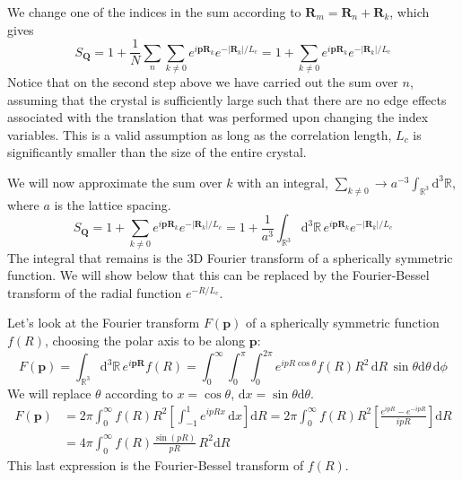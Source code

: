 \documentclass[11pt,letter]{article}
\newcommand{\bv}[1]{\ensuremath{\bm{#1}}}
\begin{document}
We change one of the indices in the sum according to
$\bv{R}_{m} = \bv{R}_{n} + \bv{R}_{k}$, which gives
\begin{equation}
S_{\bv{Q}} = 1+  
   \frac{1}{N} 
      \sum_{n}\sum_{k\neq 0}  
      e^{ i \bv{p}\bv{R}_{k} } 
   e^{-|\bv{R}_{k}| / L_{c} }  
   = 1+ 
      \sum_{k\neq 0}  
      e^{ i \bv{p}\bv{R}_{k} } 
   e^{-|\bv{R}_{k}| / L_{c} }  
\end{equation}
Notice that on the second step above we have carried out the sum over $n$,
assuming that the crystal is sufficiently large such that there are no edge
effects associated with the translation that was performed upon changing the
index variables.  This is a valid assumption as long as the correlation length,
$L_{c}$ is significantly smaller than the size of the entire crystal. 

We will now approximate the sum over $k$ with an integral, $\sum_{k\neq 0}
\rightarrow a^{-3}\int_{\mathbb{R}^{3}} \mathrm{d}^{3}\mathbb{R}$,  where $a$
is the lattice spacing. 
\begin{equation}
S_{\bv{Q}} = 1 +  
      \sum_{k\neq 0 }  
      e^{ i \bv{p}\bv{R}_{k}  }  
   e^{-|\bv{R}_{k}| / L_{c} }  
     =  1 + 
   \frac{1}{a^{3}} 
   \int_{\mathbb{R}^{3}} \mathrm{d}^{3}\mathbb{R}  \, 
      e^{ i \bv{p}\bv{R}_{k}  }  
   e^{-|\bv{R}_{k}| / L_{c} }  
\end{equation}
The integral that remains is the 3D Fourier transform of a spherically
symmetric function.   We will show below that this can be replaced by the
Fourier-Bessel transform of the radial function  $e^{-R/L_{c}}$.   

Let's look at the Fourier transform $F(\bv{p})$ of a spherically symmetric
function $f(R)$, choosing the polar axis to be along $\bv{p}$:
\begin{equation}
 F(\bv{p}) = 
   \int_{\mathbb{R}^{3}} \mathrm{d}^{3}\mathbb{R} \, 
    e^{i \bv{p}\bv{R}} f(R)  
    = 
   \int_{0}^{\infty} \int_{0}^{\pi} \int_{0}^{2\pi} 
    e^{i p R \cos\theta} f(R) R^{2}\, \mathrm{d}R \,\sin\theta \mathrm{d}\theta\,
    \mathrm{d}\phi 
\end{equation}
We will replace $\theta$ according to $x=\cos\theta$, $\mathrm{d}x =
\sin\theta\mathrm{d}\theta$. 
\begin{equation}
\begin{split}
 F(\bv{p})  & = 
   2 \pi \int_{0}^{\infty} f(R) R^{2} 
   \left[ \int_{-1}^{1} e^{ i pRx} \,\mathrm{d}x \right] \mathrm{d}R
   =  
   2 \pi \int_{0}^{\infty} f(R) R^{2} 
   \left[ \frac{ e^{ipR} - e^{-ipR}}{ipR} \right] \mathrm{d}R \\
   & =  
   4 \pi \int_{0}^{\infty} f(R)
   \frac{ \sin(pR)}{pR}\, R^{2} 
  \mathrm{d}R
\end{split}
\end{equation}
This last expression is the Fourier-Bessel transform of $f(R)$.   
\end{document}
